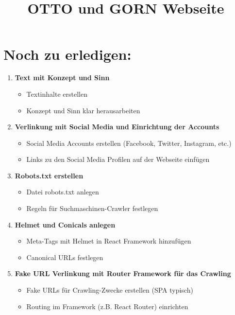 \documentclass{article}
\title{OTTO und GORN Webseite}
\author{}
\date{}
\begin{document}
\maketitle

\section*{Noch zu erledigen:}

\begin{enumerate}
    \item \textbf{Text mit Konzept und Sinn}
    \begin{itemize}
        \item Textinhalte erstellen
        \item Konzept und Sinn klar herausarbeiten
    \end{itemize}

    \item \textbf{Verlinkung mit Social Media und Einrichtung der Accounts}
    \begin{itemize}
        \item Social Media Accounts erstellen (Facebook, Twitter, Instagram, etc.)
        \item Links zu den Social Media Profilen auf der Webseite einfügen
    \end{itemize}

    \item \textbf{Robots.txt erstellen}
    \begin{itemize}
        \item Datei robots.txt anlegen
        \item Regeln für Suchmaschinen-Crawler festlegen
    \end{itemize}

    \item \textbf{Helmet und Conicals anlegen}
    \begin{itemize}
        \item Meta-Tags mit Helmet in React Framework hinzufügen
        \item Canonical URLs festlegen
    \end{itemize}

    \item \textbf{Fake URL Verlinkung mit Router Framework für das Crawling}
    \begin{itemize}
        \item Fake URLs für Crawling-Zwecke erstellen (SPA typisch)
        \item Routing im Framework (z.B. React Router) einrichten
    \end{itemize}


\end{enumerate}
\end{document}
